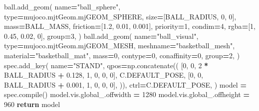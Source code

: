 \documentclass[
  chinese,
  11pt,
  letterpaper,
]{article}
\newenvironment{Shaded}{\begin{snugshade}}{\end{snugshade}}
\newcommand{\BuiltInTok}[1]{#1}
\newcommand{\ControlFlowTok}[1]{\textcolor[rgb]{0.13,0.29,0.53}{\textbf{#1}}}
\newcommand{\DecValTok}[1]{\textcolor[rgb]{0.00,0.00,0.81}{#1}}
\newcommand{\FloatTok}[1]{\textcolor[rgb]{0.00,0.00,0.81}{#1}}
\newcommand{\NormalTok}[1]{#1}
\newcommand{\OperatorTok}[1]{\textcolor[rgb]{0.81,0.36,0.00}{\textbf{#1}}}
\newcommand{\StringTok}[1]{\textcolor[rgb]{0.31,0.60,0.02}{#1}}
\renewenvironment{Shaded}{\par\smallskip}{\par\smallskip}
\begin{document}
\begin{Shaded}
\begin{Highlighting}[]
\NormalTok{    ball.add\_geom(}
\NormalTok{        name}\OperatorTok{=}\StringTok{"ball\_sphere"}\NormalTok{, }\BuiltInTok{type}\OperatorTok{=}\NormalTok{mujoco.mjtGeom.mjGEOM\_SPHERE,}
\NormalTok{        size}\OperatorTok{=}\NormalTok{[BALL\_RADIUS, }\DecValTok{0}\NormalTok{, }\DecValTok{0}\NormalTok{], mass}\OperatorTok{=}\NormalTok{BALL\_MASS, friction}\OperatorTok{=}\NormalTok{[}\FloatTok{1.2}\NormalTok{, }\FloatTok{0.01}\NormalTok{, }\FloatTok{0.001}\NormalTok{],}
\NormalTok{        priority}\OperatorTok{=}\DecValTok{1}\NormalTok{, condim}\OperatorTok{=}\DecValTok{4}\NormalTok{, rgba}\OperatorTok{=}\NormalTok{[}\DecValTok{1}\NormalTok{, }\FloatTok{0.45}\NormalTok{, }\FloatTok{0.02}\NormalTok{, }\DecValTok{0}\NormalTok{], group}\OperatorTok{=}\DecValTok{3}\NormalTok{,}
\NormalTok{    )}
\NormalTok{    ball.add\_geom(}
\NormalTok{        name}\OperatorTok{=}\StringTok{"ball\_visual"}\NormalTok{, }\BuiltInTok{type}\OperatorTok{=}\NormalTok{mujoco.mjtGeom.mjGEOM\_MESH,}
\NormalTok{        meshname}\OperatorTok{=}\StringTok{"basketball\_mesh"}\NormalTok{, material}\OperatorTok{=}\StringTok{"basketball\_mat"}\NormalTok{,}
\NormalTok{        mass}\OperatorTok{=}\DecValTok{0}\NormalTok{, contype}\OperatorTok{=}\DecValTok{0}\NormalTok{, conaffinity}\OperatorTok{=}\DecValTok{0}\NormalTok{, group}\OperatorTok{=}\DecValTok{2}\NormalTok{,}
\NormalTok{    )}
\NormalTok{    spec.add\_key(}
\NormalTok{        name}\OperatorTok{=}\StringTok{"STAND"}\NormalTok{, qpos}\OperatorTok{=}\NormalTok{np.concatenate((}
\NormalTok{            [}\DecValTok{0}\NormalTok{, }\DecValTok{0}\NormalTok{, }\DecValTok{2} \OperatorTok{*}\NormalTok{ BALL\_RADIUS }\OperatorTok{+} \FloatTok{0.128}\NormalTok{, }\DecValTok{1}\NormalTok{, }\DecValTok{0}\NormalTok{, }\DecValTok{0}\NormalTok{, }\DecValTok{0}\NormalTok{],}
\NormalTok{            C.DEFAULT\_POSE, [}\DecValTok{0}\NormalTok{, }\DecValTok{0}\NormalTok{, BALL\_RADIUS }\OperatorTok{+} \FloatTok{0.001}\NormalTok{, }\DecValTok{1}\NormalTok{, }\DecValTok{0}\NormalTok{, }\DecValTok{0}\NormalTok{, }\DecValTok{0}\NormalTok{],}
\NormalTok{        )), ctrl}\OperatorTok{=}\NormalTok{C.DEFAULT\_POSE,}
\NormalTok{    )}
\NormalTok{    model }\OperatorTok{=}\NormalTok{ spec.}\BuiltInTok{compile}\NormalTok{()}
\NormalTok{    model.vis.global\_.offwidth }\OperatorTok{=} \DecValTok{1280}
\NormalTok{    model.vis.global\_.offheight }\OperatorTok{=} \DecValTok{960}
    \ControlFlowTok{return}\NormalTok{ model}



\end{Highlighting}
\end{Shaded}
\end{document}
